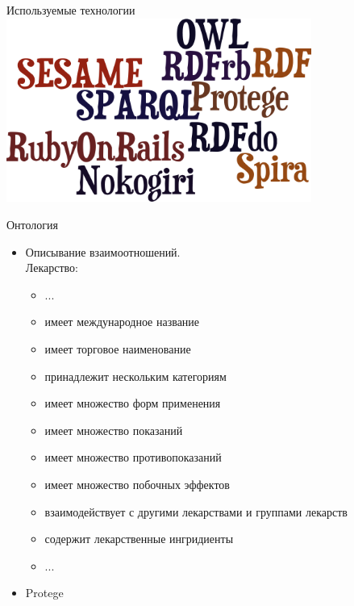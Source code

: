 \documentclass{beamer}
\begin{document}
\begin{frame}[t,fragile]{Используемые технологии}
\includegraphics[width=100mm]{words.png}
\end{frame}
\begin{frame}[t]{Онтология}
  \begin{itemize}
  \item Описывание взаимоотношений.
    \\Лекарство:
    \begin{itemize}
    \item ...
    \item имеет международное название
    \item имеет торговое наименование
    \item принадлежит нескольким категориям
    \item имеет множество форм применения
    \item имеет множество показаний
    \item имеет множество противопоказаний
    \item имеет множество побочных эффектов
    \item взаимодействует с другими лекарствами и группами лекарств
    \item содержит лекарственные ингридиенты
    \item ...
    \end{itemize}
  \item Protege
  \end{itemize}
\end{frame}
\end{document}
